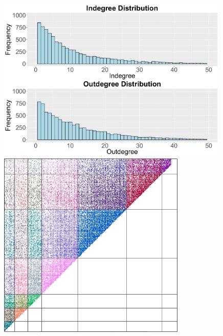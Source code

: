 \documentclass{cup-pan}
\begin{document}
\begin{figure}[bt]
\centering
\begin{minipage}{.37\linewidth}
\centering
\includegraphics[width = 0.99\textwidth]{degree_distribution.pdf}
\includegraphics[width = 0.8\textwidth]{data_mat.png}%
\end{minipage}%
\begin{minipage}{.63\linewidth}

\end{minipage}
\end{figure}
\end{document}
